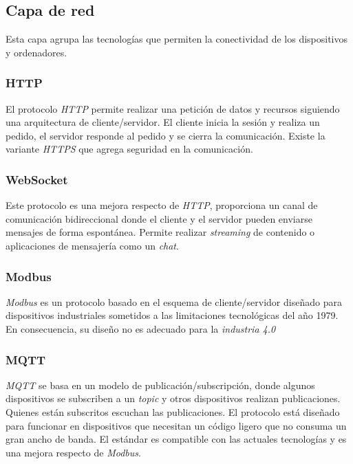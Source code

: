 	\subsection{Capa de red}
	\label{capaRed}
	
		Esta capa agrupa las tecnologías que permiten la conectividad de los dispositivos y ordenadores.
	
		\subsubsection{HTTP}
		
			El protocolo \emph{HTTP} permite realizar una petición de datos y recursos siguiendo una arquitectura de cliente/servidor. El cliente inicia la sesión y realiza un pedido, el servidor responde al pedido y se cierra la comunicación. Existe la variante \emph{HTTPS} que agrega seguridad en la comunicación.
		
		\subsubsection{WebSocket}
		
			Este protocolo es una mejora respecto de \emph{HTTP}, proporciona un canal de comunicación bidireccional donde el cliente y el servidor pueden enviarse mensajes de forma espontánea. Permite realizar \emph{streaming} de contenido o aplicaciones de mensajería como un \emph{chat}.
		
		\subsubsection{Modbus}
		
			\emph{Modbus} es un protocolo basado en el esquema de cliente/servidor diseñado para dispositivos industriales sometidos a las limitaciones tecnológicas del año 1979. En consecuencia, su diseño no es adecuado para la \emph{industria 4.0}
		
		\subsubsection{MQTT}
		
			\emph{MQTT} se basa en un modelo de publicación/subscripción, donde algunos dispositivos se subscriben a un \emph{topic} y otros dispositivos realizan publicaciones. Quienes están subscritos escuchan las publicaciones. El protocolo está diseñado para funcionar en dispositivos que necesitan un código ligero que no consuma un gran ancho de banda. El estándar es compatible con las actuales tecnologías y es una mejora respecto de \emph{Modbus}.
						

